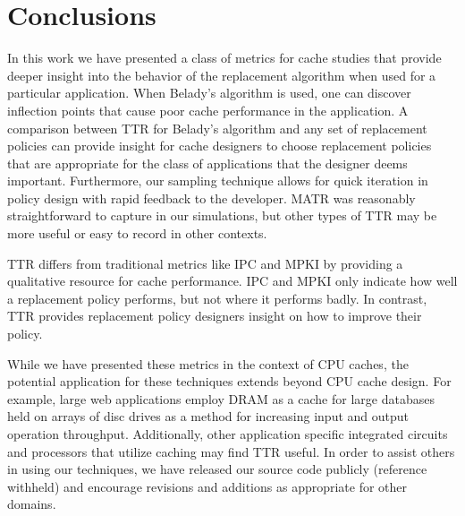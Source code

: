 \section{Conclusions}
In this work we have presented a class of metrics for cache studies
that provide deeper insight into the behavior of the replacement
algorithm when used for a particular application.
When Belady's algorithm is used, one can discover inflection points
that cause poor cache performance in the application.
A comparison between TTR for Belady's algorithm and any set of
replacement policies can provide insight for cache designers to choose
replacement policies that are appropriate for the class of
applications that the designer deems important.
Furthermore, our sampling technique allows for quick iteration in
policy design with rapid feedback to the developer.
MATR was reasonably straightforward to capture in our simulations, but
other types of TTR may be more useful or easy to record in other
contexts.

TTR differs from traditional metrics like IPC and MPKI by providing a qualitative resource for cache performance.
IPC and MPKI only indicate how well a replacement policy performs, but not where it performs badly.
In contrast, TTR provides replacement policy designers insight on how to improve their policy.

While we have presented these metrics in the context of CPU caches,
the potential application for these techniques extends beyond CPU
cache design.
For example, large web applications employ DRAM as a cache for large
databases held on arrays of disc drives as a method for increasing
input and output operation throughput.
Additionally, other application specific integrated circuits and
processors that utilize caching may find TTR useful.
In order to assist others in using our techniques, we have released
our source code publicly (reference withheld) and encourage revisions
and additions as appropriate for other domains.
